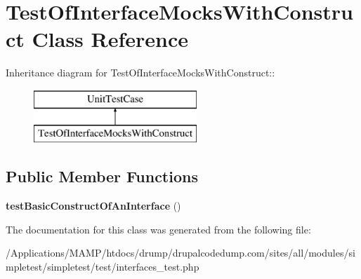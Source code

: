 \hypertarget{class_test_of_interface_mocks_with_construct}{
\section{TestOfInterfaceMocksWithConstruct Class Reference}
\label{class_test_of_interface_mocks_with_construct}
}
Inheritance diagram for TestOfInterfaceMocksWithConstruct::\begin{figure}[H]
\begin{center}
\leavevmode
\includegraphics[height=2cm]{class_test_of_interface_mocks_with_construct}
\end{center}
\end{figure}
\subsection*{Public Member Functions}
\begin{DoxyCompactItemize}
\item 
\hypertarget{class_test_of_interface_mocks_with_construct_ae6555136539dcfc6d86d90eaf286735a}{
{\bfseries testBasicConstructOfAnInterface} ()}
\label{class_test_of_interface_mocks_with_construct_ae6555136539dcfc6d86d90eaf286735a}

\end{DoxyCompactItemize}


The documentation for this class was generated from the following file:\begin{DoxyCompactItemize}
\item 
/Applications/MAMP/htdocs/drump/drupalcodedump.com/sites/all/modules/simpletest/simpletest/test/interfaces\_\-test.php\end{DoxyCompactItemize}
